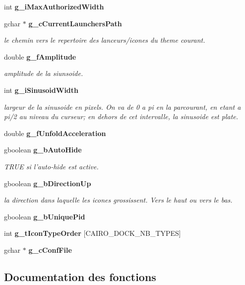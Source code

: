 \begin{CompactItemize}
int {\bf g\_\-i\-Max\-Authorized\-Width}
\item 
gchar $\ast$ {\bf g\_\-c\-Current\-Launchers\-Path}
\begin{CompactList}\small\item\em le chemin vers le repertoire des lanceurs/icones du theme courant. \item\end{CompactList}\item 
double {\bf g\_\-f\-Amplitude}
\begin{CompactList}\small\item\em amplitude de la siunsoide. \item\end{CompactList}\item 
int {\bf g\_\-i\-Sinusoid\-Width}
\begin{CompactList}\small\item\em largeur de la sinusoide en pixels. On va de 0 a pi en la parcourant, en etant a pi/2 au niveau du curseur; en dehors de cet intervalle, la sinusoide est plate. \item\end{CompactList}\item 
double {\bf g\_\-f\-Unfold\-Acceleration}
\item 
gboolean {\bf g\_\-b\-Auto\-Hide}
\begin{CompactList}\small\item\em TRUE si l'auto-hide est active. \item\end{CompactList}\item 
gboolean {\bf g\_\-b\-Direction\-Up}
\begin{CompactList}\small\item\em la direction dans laquelle les icones grossissent. Vers le haut ou vers le bas. \item\end{CompactList}\item 
gboolean {\bf g\_\-b\-Unique\-Pid}
\item 
int {\bf g\_\-t\-Icon\-Type\-Order} [CAIRO\_\-DOCK\_\-NB\_\-TYPES]
\item 
gchar $\ast$ {\bf g\_\-c\-Conf\-File}
\end{CompactItemize}


\subsection{Documentation des fonctions}
